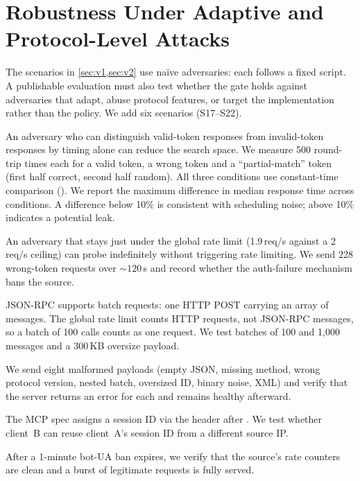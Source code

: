 \documentclass[10pt,twocolumn]{article}
\begin{document}
\section{Robustness Under Adaptive and Protocol-Level Attacks}\label{sec:robust}
The scenarios in \cref{sec:v1,sec:v2} use na\"ive adversaries: each follows a
fixed script. A publishable evaluation must also test whether the gate holds
against adversaries that adapt, abuse protocol features, or target the
implementation rather than the policy. We add six scenarios (S17--S22).

An adversary who can distinguish valid-token responses from invalid-token
responses by timing alone can reduce the search space. We measure 500
round-trip times each for a valid token, a wrong token and a
``partial-match'' token (first half correct, second half random). All three
conditions use constant-time comparison ().
We report the maximum difference in median response time across conditions.
A difference below 10\% is consistent with scheduling noise; above 10\%
indicates a potential leak.

An adversary that stays just under the global rate limit (1.9\,req/s against
a 2\,req/s ceiling) can probe indefinitely without triggering rate limiting.
We send 228 wrong-token requests over ${\sim}120$\,s and record whether the
auth-failure mechanism bans the source.

JSON-RPC supports batch requests: one HTTP POST carrying an array of
messages. The global rate limit counts HTTP requests, not JSON-RPC messages,
so a batch of 100  calls counts as one request.
We test batches of 100 and 1{,}000 messages and a 300\,KB oversize payload.

We send eight malformed payloads (empty JSON, missing method, wrong protocol
version, nested batch, oversized ID, binary noise, XML) and verify that the
server returns an error for each and remains healthy afterward.

The MCP spec assigns a session ID via the  header after
. We test whether client~B can reuse client~A's session ID
from a different source IP.

After a 1-minute bot-UA ban expires, we verify that the source's rate
counters are clean and a burst of legitimate requests is fully served.
\end{document}
